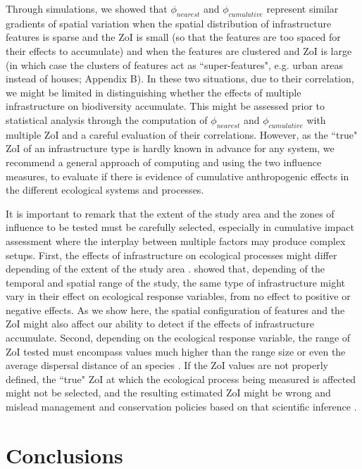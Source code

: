 \documentclass[titlepage]{article}
\begin{document}
Through simulations, we showed that $\phi_{nearest}$ and $\phi_{cumulative}$ represent similar gradients of spatial variation when the spatial distribution of infrastructure features is sparse and the ZoI is small (so that the features are too spaced for their effects to accumulate) and when the features are clustered and ZoI is large (in which case the clusters of features act as ``super-features", e.g. urban areas instead of houses; Appendix B). In these two situations, due to their correlation, we might be limited in distinguishing whether the effects of multiple infrastructure on biodiversity accumulate. This might be assessed prior to statistical analysis through the computation of $\phi_{nearest}$ and $\phi_{cumulative}$ with multiple ZoI and a careful evaluation of their correlations. However, as the ``true" ZoI of an infrastructure type is hardly known in advance for any system, we recommend a general approach of computing and using the two influence measures, to evaluate if there is evidence of cumulative anthropogenic effects in the different ecological systems and processes.

It is important to remark that the extent of the study area and the zones of influence to be tested must be carefully selected, especially in cumulative impact assessment where the interplay between multiple factors may produce complex setups. First, the effects of infrastructure on ecological processes might differ depending of the extent of the study area \citep{vistnes_matter_2008}. \citet{skarin_human_2014} showed that, depending of the temporal and spatial range of the study, the same type of infrastructure might vary in their effect on ecological response variables, from no effect to positive or negative effects. As we show here, the spatial configuration of features and the ZoI might also affect our ability to detect if the effects of infrastructure accumulate. 
Second, depending on the ecological response variable, the range of ZoI tested must encompass values much higher than the range size or even the average dispersal distance of an species \citep{jackson_what_2012}. If the ZoI values are not properly defined, the ``true" ZoI at which the ecological process being measured is affected might not be selected, and the resulting estimated ZoI might be wrong and mislead management and conservation policies based on that scientific inference \citep[e.g.][]{jackson_are_2015}.

\section{Conclusions}
\end{document}
